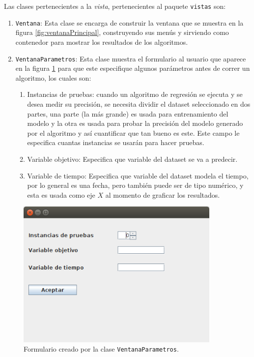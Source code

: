 Las clases pertenecientes a la \textit{vista}, pertenecientes al paquete \texttt{vistas} son:

\renewcommand{\labelenumi}{$\bullet$ }
\begin{enumerate}
	\item \texttt{Ventana}: Esta clase se encarga de construir la ventana que se muestra en la figura \ref{fig:ventanaPrincipal}, construyendo sus menús y sirviendo como contenedor para mostrar los resultados de los algoritmos.
	
	\item \texttt{VentanaParametros}: Esta clase muestra el formulario al usuario que aparece en la figura \ref{fig:VentanaParametros} para que este especifique algunos parámetros antes de correr un algoritmo, los cuales son:
	
	 \begin{enumerate}
	 	\item Instancias de pruebas: cuando un algoritmo de regresión se ejecuta y se desea medir su precisión, se necesita dividir el dataset seleccionado en dos partes, una parte (la más grande) es usada para entrenamiento del modelo y la otra es usada para probar la precisión del modelo generado por el algoritmo y así cuantificar que tan bueno es este. Este campo le especifica cuantas instancias se usarán para hacer pruebas.

	 	\item Variable objetivo: Especifica que variable del dataset se va a predecir.

	 	\item Variable de tiempo: Especifica que variable del dataset modela el tiempo, por lo general es una fecha, pero también puede ser de tipo numérico, y esta es usada como eje $X$ al momento de graficar los resultados.
	 \end{enumerate} 

\end{enumerate}

\begin{figure}[ht]
	\centering
	\includegraphics[width=10cm]{img/VentanaParametros.png}
	\caption{Formulario creado por la clase \texttt{VentanaParametros}.}
	\label{fig:VentanaParametros}
\end{figure}

